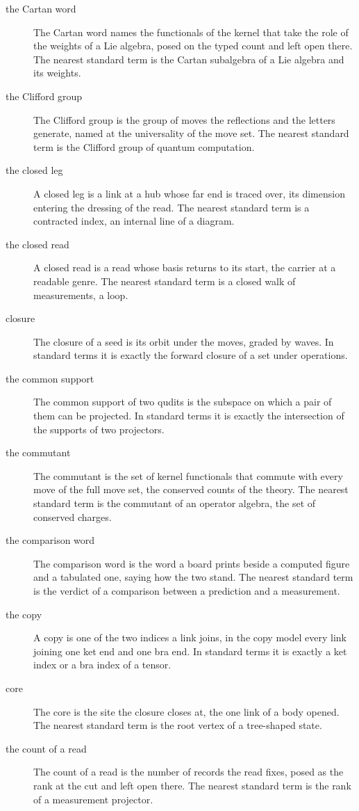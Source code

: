 \begin{description}
\item[the Cartan word] The Cartan word names the functionals of the kernel that take the role of the weights of a Lie algebra, posed on the typed count and left open there. The nearest standard term is the Cartan subalgebra of a Lie algebra and its weights.
\item[the Clifford group] The Clifford group is the group of moves the reflections and the letters generate, named at the universality of the move set. The nearest standard term is the Clifford group of quantum computation.
\item[the closed leg] A closed leg is a link at a hub whose far end is traced over, its dimension entering the dressing of the read. The nearest standard term is a contracted index, an internal line of a diagram.
\item[the closed read] A closed read is a read whose basis returns to its start, the carrier at a readable genre. The nearest standard term is a closed walk of measurements, a loop.
\item[closure] The closure of a seed is its orbit under the moves, graded by waves. In standard terms it is exactly the forward closure of a set under operations.
\item[the common support] The common support of two qudits is the subspace on which a pair of them can be projected. In standard terms it is exactly the intersection of the supports of two projectors.
\item[the commutant] The commutant is the set of kernel functionals that commute with every move of the full move set, the conserved counts of the theory. The nearest standard term is the commutant of an operator algebra, the set of conserved charges.
\item[the comparison word] The comparison word is the word a board prints beside a computed figure and a tabulated one, saying how the two stand. The nearest standard term is the verdict of a comparison between a prediction and a measurement.
\item[the copy] A copy is one of the two indices a link joins, in the copy model every link joining one ket end and one bra end. In standard terms it is exactly a ket index or a bra index of a tensor.
\item[core] The core is the site the closure closes at, the one link of a body opened. The nearest standard term is the root vertex of a tree-shaped state.
\item[the count of a read] The count of a read is the number of records the read fixes, posed as the rank at the cut and left open there. The nearest standard term is the rank of a measurement projector.

\end{description}
